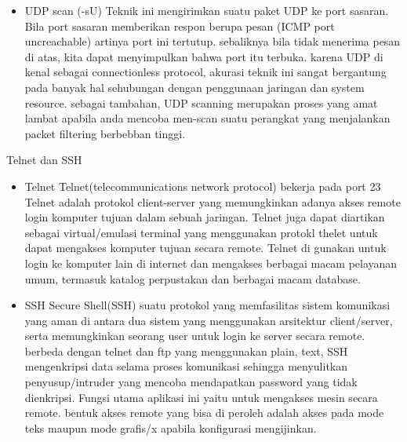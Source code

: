 \begin{itemize}
   \item UDP scan (-sU)
         Teknik ini mengirimkan suatu paket UDP ke port sasaran. Bila port sasaran memberikan respon berupa pesan (ICMP port uncreachable) artinya port ini tertutup. sebaliknya bila tidak menerima pesan di atas, kita dapat menyimpulkan bahwa port itu terbuka. karena UDP di kenal sebagai connectionless protocol, akurasi teknik ini sangat bergantung pada banyak hal sehubungan dengan penggunaan jaringan dan system resource. sebagai tambahan, UDP scanning merupakan proses yang amat lambat apabila anda mencoba men-scan suatu perangkat yang menjalankan packet filtering berbebban tinggi.
 \end{itemize}

Telnet dan SSH
\begin{itemize}
  \item Telnet
        Telnet(telecommunications network protocol) bekerja pada port 23
        Telnet adalah protokol client-server yang memungkinkan adanya akses remote login komputer tujuan dalam sebuah jaringan. Telnet juga dapat diartikan sebagai virtual/emulasi terminal yang menggunakan protokl thelet untuk dapat mengakses komputer tujuan secara remote. Telnet di gunakan untuk login ke komputer lain di internet dan mengakses berbagai macam pelayanan umum, termasuk katalog perpustakan dan berbagai macam database.
  \item SSH
        Secure Shell(SSH) suatu protokol yang memfasilitas sistem komunikasi yang aman di antara dua sistem yang menggunakan arsitektur client/server, serta memungkinkan seorang user untuk login ke server secara remote. berbeda dengan telnet dan ftp yang menggunakan plain, text, SSH mengenkripsi data selama proses komunikasi sehingga menyulitkan penyusup/intruder yang mencoba mendapatkan password yang tidak dienkripsi. Fungsi utama aplikasi ini yaitu untuk mengakses mesin secara remote. bentuk akses remote yang bisa di peroleh adalah akses pada mode teks maupun mode grafis/x apabila konfigurasi mengijinkan.
\end{itemize}
